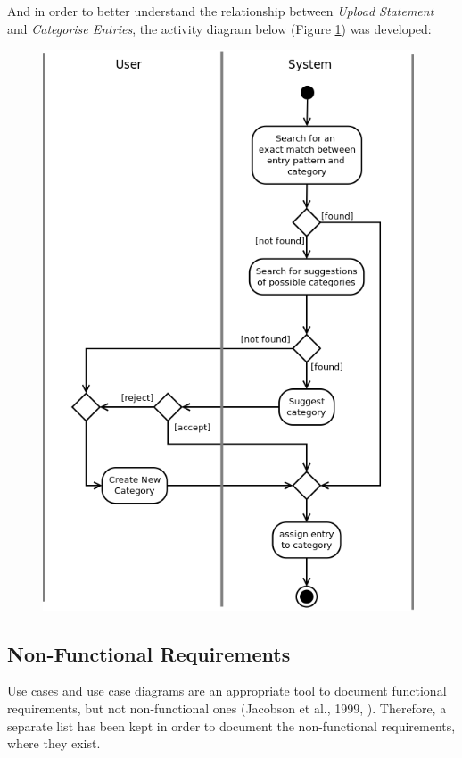 And in order to better understand the relationship between \emph{Upload
Statement} and \emph{Categorise Entries}, the activity diagram below (Figure
\ref{fig:AD.CategoriseEntries}) was developed:
\begin{figure}[ht!]
  \begin{center}
    \includegraphics[width=11cm]{./contents/img/Activity_Diagram_-_Categorise_Entries.png}
  \end{center}
  \caption{}
  \label{fig:AD.CategoriseEntries}
\end{figure}
\FloatBarrier


\subsection{Non-Functional Requirements} \label{sec:Requirements.NonFunctionalRequirements}
Use cases and use case diagrams are an appropriate tool to document functional
requirements, but not non-functional ones (Jacobson et al., 1999,
\cite[cited][p.~153]{bennett2010object}). Therefore, a separate list has been
kept in order to document the non-functional requirements, where they exist.
